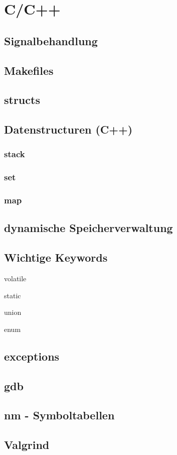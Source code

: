 \section{C/C++}

\subsection{Signalbehandlung}

\subsection{Makefiles}

\subsection{structs}

\subsection{Datenstructuren (C++)}

\subsubsection*{stack}

\subsubsection*{set}

\subsubsection*{map}

\subsection{dynamische Speicherverwaltung}

\subsection{Wichtige Keywords}
	\begin{description}
	\item volatile
	\item static
	\item union
	\item enum
	\end{description}

\subsection{exceptions}
	
\subsection{gdb}

\subsection{nm - Symboltabellen}

\subsection{Valgrind}


